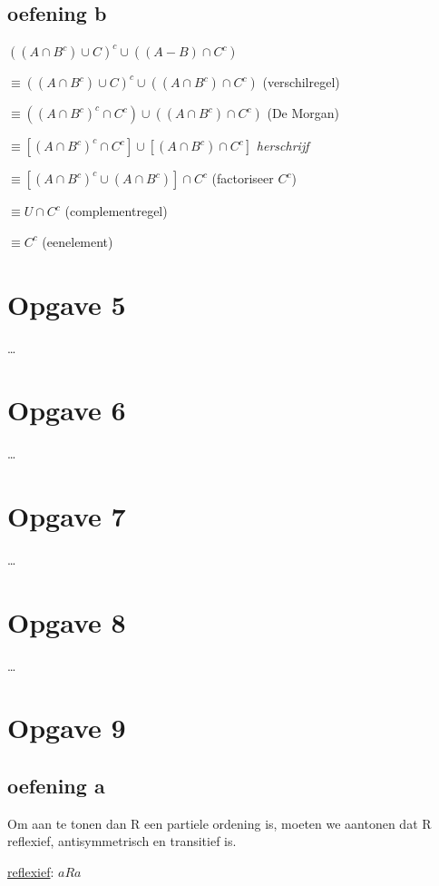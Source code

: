 \documentclass[11pt, a4paper]{article}
\begin{document}
\subsection*{oefening b}

${((A \cap {B}^c) \cup C)}^c \cup ((A-B)\cap C^c)$

$\equiv {((A \cap {B}^c) \cup C)}^c \cup ((A \cap B^c)\cap C^c)$ \hfill (verschilregel)

$\equiv {({(A \cap {B}^c)}^c \cap C^c)} \cup ((A \cap B^c)\cap C^c)$ \hfill (De Morgan)

$\equiv {[{(A \cap {B}^c)}^c \cap C^c]} \cup [(A \cap B^c)\cap C^c]$ \hfill \textit{herschrijf}

$\equiv [{{(A \cap {B}^c)}^c} \cup (A \cap B^c)] \cap C^c$ \hfill (factoriseer $C^c$)

$\equiv U \cap C^c$ \hfill (complementregel)

$\equiv C^c$ \hfill (eenelement)


\pagebreak
\section*{Opgave 5}
\ldots

\pagebreak
\section*{Opgave 6}
\ldots

\pagebreak
\section*{Opgave 7}
\ldots

\pagebreak
\section*{Opgave 8}
\ldots

\pagebreak
\section*{Opgave 9}

\subsection*{oefening a}

Om aan te tonen dan R een partiele ordening is, moeten we aantonen dat R reflexief, antisymmetrisch en transitief is.

\underline{reflexief}:
$aRa$
\end{document}
